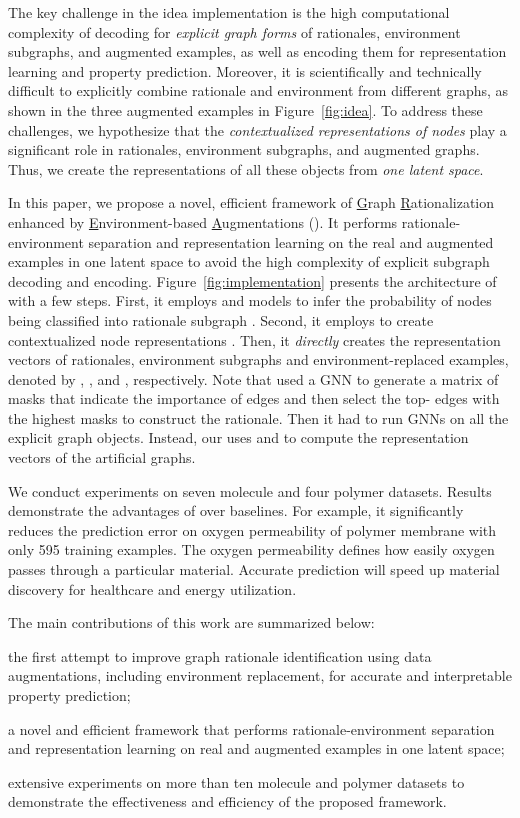 \documentclass[sigconf]{acmart}
\begin{document}
The key challenge in the idea implementation is the high computational complexity of decoding for \emph{explicit graph forms} of rationales, environment subgraphs, and augmented examples, as well as encoding them for representation learning and property prediction.
Moreover, it is scientifically and technically difficult to explicitly combine rationale  and environment  from different graphs, as shown in the three augmented examples  in Figure~\ref{fig:idea}. To address these challenges, we hypothesize that the \emph{contextualized representations of nodes} play a significant role in rationales, environment subgraphs, and augmented graphs. 
Thus, we create the representations of all these objects from \emph{one latent space}.

In this paper, we propose a novel, efficient framework of \underline{G}raph \underline{R}ationalization enhanced by \underline{E}nvironment-based \underline{A}ugmentations (\method).
It performs rationale-environment separation and representation learning on the real and augmented examples in  one latent space to avoid the high complexity of explicit subgraph decoding and encoding.
Figure~\ref{fig:implementation} presents the architecture of \method with a few steps.
First, it employs  and  models to infer the probability of nodes being classified into rationale subgraph .
Second, it employs  to create contextualized node representations .
Then, it \emph{directly} creates the representation vectors of rationales, environment subgraphs and environment-replaced examples, denoted by , , and , respectively. Note that \dir \cite{wu2022discovering} used a GNN to generate a matrix of masks that indicate the importance of edges and then select the top- edges with the highest masks to construct the rationale. Then it had to run GNNs on all the explicit graph objects.
Instead, our \method uses  and  to compute the representation vectors of the artificial graphs.

We conduct experiments on seven molecule and four polymer datasets. Results demonstrate the advantages of \method over baselines. For example, it significantly reduces the prediction error on oxygen permeability of polymer membrane with only 595 training examples. The oxygen permeability defines how easily oxygen passes through a particular material. Accurate prediction will speed up material discovery for healthcare and energy utilization.

The main contributions of this work are summarized below:
\begin{compactitem}
    \item the first attempt to improve graph rationale identification using data augmentations, including environment replacement, for accurate and interpretable property prediction;
    \item a novel and efficient framework that performs rationale-environment separation and representation learning on real and augmented examples in one latent space;
    \item extensive experiments on more than ten molecule and polymer datasets to demonstrate the effectiveness and efficiency of the proposed framework.
\end{compactitem} 
\end{document}
